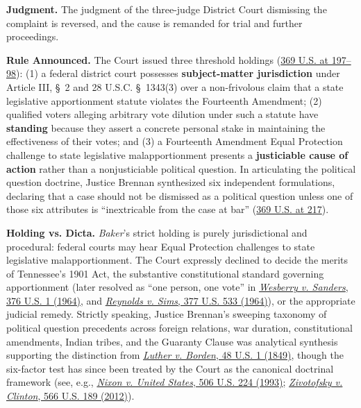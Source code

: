 \documentclass[12pt]{article}
\begin{document}
\textbf{Judgment.} The judgment of the three-judge District Court dismissing the complaint is reversed, and the cause is remanded for trial and further proceedings.

\textbf{Rule Announced.} The Court issued three threshold holdings (\href{https://supreme.justia.com/cases/federal/us/369/186/}{369 U.S. at 197--98}): (1) a federal district court possesses \textbf{subject-matter jurisdiction} under Article III, \S~2 and 28 U.S.C. \S~1343(3) over a non-frivolous claim that a state legislative apportionment statute violates the Fourteenth Amendment; (2) qualified voters alleging arbitrary vote dilution under such a statute have \textbf{standing} because they assert a concrete personal stake in maintaining the effectiveness of their votes; and (3) a Fourteenth Amendment Equal Protection challenge to state legislative malapportionment presents a \textbf{justiciable cause of action} rather than a nonjusticiable political question. In articulating the political question doctrine, Justice Brennan synthesized six independent formulations, declaring that a case should not be dismissed as a political question unless one of those six attributes is ``inextricable from the case at bar'' (\href{https://supreme.justia.com/cases/federal/us/369/186/}{369 U.S. at 217}).

\textbf{Holding vs. Dicta.} \textit{Baker}'s strict holding is purely jurisdictional and procedural: federal courts may hear Equal Protection challenges to state legislative malapportionment. The Court expressly declined to decide the merits of Tennessee's 1901 Act, the substantive constitutional standard governing apportionment (later resolved as ``one person, one vote'' in \href{https://supreme.justia.com/cases/federal/us/376/1/}{\textit{Wesberry v. Sanders}, 376 U.S. 1 (1964)}, and \href{https://supreme.justia.com/cases/federal/us/377/533/}{\textit{Reynolds v. Sims}, 377 U.S. 533 (1964)}), or the appropriate judicial remedy. Strictly speaking, Justice Brennan's sweeping taxonomy of political question precedents across foreign relations, war duration, constitutional amendments, Indian tribes, and the Guaranty Clause was analytical synthesis supporting the distinction from \href{https://supreme.justia.com/cases/federal/us/48/1/}{\textit{Luther v. Borden}, 48 U.S. 1 (1849)}, though the six-factor test has since been treated by the Court as the canonical doctrinal framework (see, e.g., \href{https://supreme.justia.com/cases/federal/us/506/224/}{\textit{Nixon v. United States}, 506 U.S. 224 (1993)}; \href{https://supreme.justia.com/cases/federal/us/566/189/}{\textit{Zivotofsky v. Clinton}, 566 U.S. 189 (2012)}).
\end{document}
